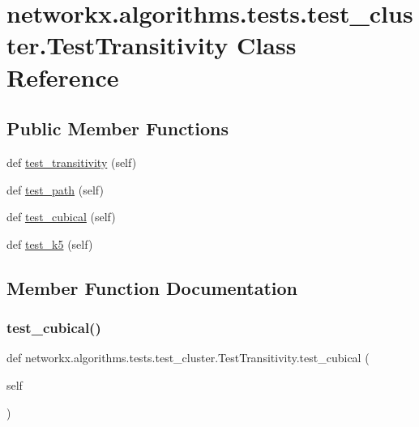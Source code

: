 \hypertarget{classnetworkx_1_1algorithms_1_1tests_1_1test__cluster_1_1TestTransitivity}{}\section{networkx.\+algorithms.\+tests.\+test\+\_\+cluster.\+Test\+Transitivity Class Reference}
\label{classnetworkx_1_1algorithms_1_1tests_1_1test__cluster_1_1TestTransitivity}
\subsection*{Public Member Functions}
\begin{DoxyCompactItemize}
\item 
def \hyperlink{classnetworkx_1_1algorithms_1_1tests_1_1test__cluster_1_1TestTransitivity_a94d7870c047c8b5763e9bee74697f80a}{test\+\_\+transitivity} (self)
\item 
def \hyperlink{classnetworkx_1_1algorithms_1_1tests_1_1test__cluster_1_1TestTransitivity_a80d5a2420f1b5bf3378d584cd0ee8637}{test\+\_\+path} (self)
\item 
def \hyperlink{classnetworkx_1_1algorithms_1_1tests_1_1test__cluster_1_1TestTransitivity_ad7b3e3475285af1a9b5e8f2b1cd169cb}{test\+\_\+cubical} (self)
\item 
def \hyperlink{classnetworkx_1_1algorithms_1_1tests_1_1test__cluster_1_1TestTransitivity_ad844b8e9b1b30c7cec2717dab140592d}{test\+\_\+k5} (self)
\end{DoxyCompactItemize}


\subsection{Member Function Documentation}
\mbox{\label{classnetworkx_1_1algorithms_1_1tests_1_1test__cluster_1_1TestTransitivity_ad7b3e3475285af1a9b5e8f2b1cd169cb}} 
\subsubsection{\texorpdfstring{test\+\_\+cubical()}{test\_cubical()}}
{\footnotesize\ttfamily def networkx.\+algorithms.\+tests.\+test\+\_\+cluster.\+Test\+Transitivity.\+test\+\_\+cubical (\begin{DoxyParamCaption}\item[{}]{self }\end{DoxyParamCaption})}

